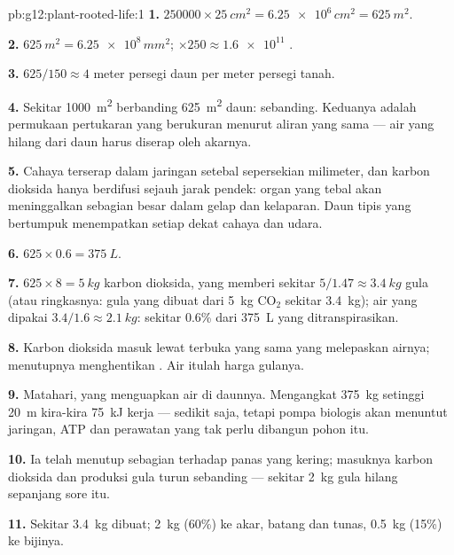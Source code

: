 \begin{solution}{pb:g12:plant-rooted-life:1}
\textbf{1.} $\num{250000} \times \qty{25}{cm^2} = \num{6.25e6}\,
\unit{cm^2} = \qty{625}{m^2}$.

\textbf{2.} $\qty{625}{m^2} = \num{6.25e8}\,\unit{mm^2}$; $\times 250
\approx \num{1.6e11}$ .

\textbf{3.} $625/150 \approx 4$ meter persegi daun per meter persegi
tanah.

\textbf{4.} Sekitar \qty{1000}{m^2}  berbanding
\qty{625}{m^2} daun: sebanding. Keduanya adalah permukaan pertukaran
yang berukuran menurut aliran yang sama --- air yang hilang dari daun
harus diserap oleh akarnya.

\textbf{5.} Cahaya terserap dalam jaringan setebal sepersekian
milimeter, dan karbon dioksida hanya berdifusi sejauh jarak pendek:
organ yang tebal akan meninggalkan sebagian besar  dalam gelap
dan kelaparan. Daun tipis yang bertumpuk menempatkan setiap  dekat
cahaya dan udara.

\textbf{6.} $625 \times 0.6 = \qty{375}{L}$.

\textbf{7.} $625 \times 8 = \qty{5}{kg}$ karbon dioksida, yang memberi
sekitar $5/1.47 \approx \qty{3.4}{kg}$ gula (atau ringkasnya: gula yang
dibuat dari \qty{5}{kg} $\mathrm{CO_2}$ sekitar \qty{3.4}{kg}); air
yang dipakai $3.4/1.6 \approx \qty{2.1}{kg}$: sekitar 0.6\% dari
\qty{375}{L} yang ditranspirasikan.

\textbf{8.} Karbon dioksida masuk lewat  terbuka yang sama yang
melepaskan airnya; menutupnya menghentikan . Air itulah
harga gulanya.

\textbf{9.} Matahari, yang menguapkan air di daunnya. Mengangkat
\qty{375}{kg} setinggi \qty{20}{m} kira-kira \qty{75}{kJ} kerja ---
sedikit saja, tetapi pompa biologis akan menuntut jaringan, ATP dan
perawatan yang tak perlu dibangun pohon itu.

\textbf{10.} Ia telah menutup sebagian  terhadap panas yang
kering; masuknya karbon dioksida dan produksi gula turun sebanding ---
sekitar \qty{2}{kg} gula hilang sepanjang sore itu.

\textbf{11.} Sekitar \qty{3.4}{kg} dibuat; \qty{2}{kg} (60\%) ke akar,
batang dan tunas, \qty{0.5}{kg} (15\%) ke bijinya.


\end{solution}
